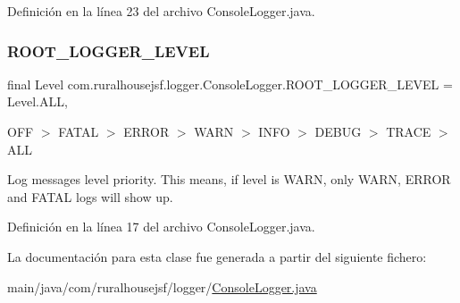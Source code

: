 Definición en la línea 23 del archivo Console\+Logger.\+java.

\mbox{\label{a00220_ae460ea729626c8bac117b5d2e27913fa}} 
\subsubsection{\texorpdfstring{ROOT\_LOGGER\_LEVEL}{ROOT\_LOGGER\_LEVEL}}
{\footnotesize\ttfamily final Level com.\+ruralhousejsf.\+logger.\+Console\+Logger.\+R\+O\+O\+T\+\_\+\+L\+O\+G\+G\+E\+R\+\_\+\+L\+E\+V\+EL = Level.\+A\+LL\hspace{0.3cm}{\ttfamily [static]}, {\ttfamily [private]}}



{\ttfamily O\+FF $>$ F\+A\+T\+AL $>$ E\+R\+R\+OR $>$ W\+A\+RN $>$ I\+N\+FO $>$ D\+E\+B\+UG $>$ T\+R\+A\+CE $>$ A\+LL} 

Log messages level priority. This means, if level is {\ttfamily W\+A\+RN}, only {\ttfamily W\+A\+RN}, {\ttfamily E\+R\+R\+OR} and {\ttfamily F\+A\+T\+AL} logs will show up. 

Definición en la línea 17 del archivo Console\+Logger.\+java.



La documentación para esta clase fue generada a partir del siguiente fichero\+:\begin{DoxyCompactItemize}
\item 
main/java/com/ruralhousejsf/logger/\mbox{\hyperlink{a00071}{Console\+Logger.\+java}}\end{DoxyCompactItemize}
